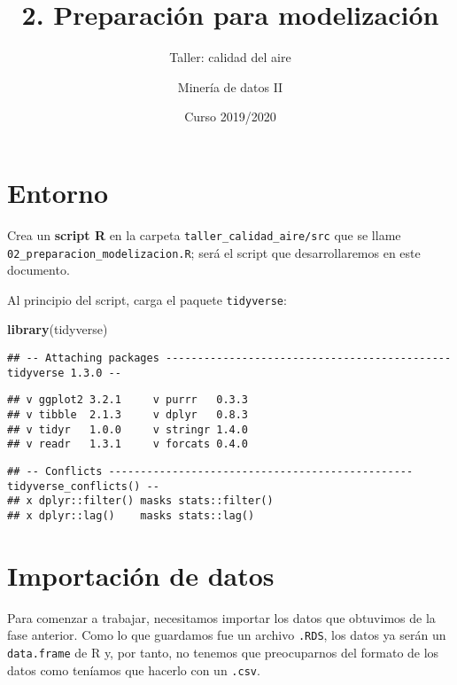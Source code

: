 \documentclass[]{article}
\title{2. Preparación para modelización}
\subtitle{Taller: calidad del aire}
\author{Minería de datos II}
\date{Curso 2019/2020}
\newenvironment{Shaded}{\begin{snugshade}}{\end{snugshade}}
\newcommand{\KeywordTok}[1]{\textcolor[rgb]{0.13,0.29,0.53}{\textbf{#1}}}
\newcommand{\NormalTok}[1]{#1}
\begin{document}
\maketitle

{
\setcounter{tocdepth}{2}
\tableofcontents
}
\hypertarget{entorno}{%
\section{Entorno}\label{entorno}}

Crea un \textbf{script R} en la carpeta
\texttt{taller\_calidad\_aire/src} que se llame
\texttt{02\_preparacion\_modelizacion.R}; será el script que
desarrollaremos en este documento.

Al principio del script, carga el paquete \texttt{tidyverse}:

\begin{Shaded}
\begin{Highlighting}[]
\KeywordTok{library}\NormalTok{(tidyverse)}
\end{Highlighting}
\end{Shaded}

\begin{verbatim}
## -- Attaching packages --------------------------------------------- tidyverse 1.3.0 --
\end{verbatim}

\begin{verbatim}
## v ggplot2 3.2.1     v purrr   0.3.3
## v tibble  2.1.3     v dplyr   0.8.3
## v tidyr   1.0.0     v stringr 1.4.0
## v readr   1.3.1     v forcats 0.4.0
\end{verbatim}

\begin{verbatim}
## -- Conflicts ------------------------------------------------ tidyverse_conflicts() --
## x dplyr::filter() masks stats::filter()
## x dplyr::lag()    masks stats::lag()
\end{verbatim}

\hypertarget{importaciuxf3n-de-datos}{%
\section{Importación de datos}\label{importaciuxf3n-de-datos}}

Para comenzar a trabajar, necesitamos importar los datos que obtuvimos
de la fase anterior. Como lo que guardamos fue un archivo \texttt{.RDS},
los datos ya serán un \texttt{data.frame} de R y, por tanto, no tenemos
que preocuparnos del formato de los datos como teníamos que hacerlo con
un \texttt{.csv}.
\end{document}
